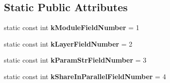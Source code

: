 \subsection*{Static Public Attributes}
\begin{DoxyCompactItemize}
\item 
\mbox{\label{classcaffe_1_1_python_parameter_ab3c93841230be7e030af962f9abf28ea}} 
static const int {\bfseries k\+Module\+Field\+Number} = 1
\item 
\mbox{\label{classcaffe_1_1_python_parameter_a2dc79d315167c8592fdc93bcebc4554c}} 
static const int {\bfseries k\+Layer\+Field\+Number} = 2
\item 
\mbox{\label{classcaffe_1_1_python_parameter_a34f6da3a2dd5930a8f1d7b671c48335b}} 
static const int {\bfseries k\+Param\+Str\+Field\+Number} = 3
\item 
\mbox{\label{classcaffe_1_1_python_parameter_a060db8bf48066d724aa5179c8098e84b}} 
static const int {\bfseries k\+Share\+In\+Parallel\+Field\+Number} = 4
\end{DoxyCompactItemize}
